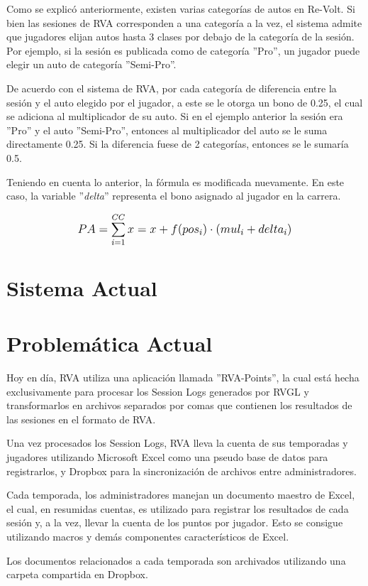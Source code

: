 Como se explicó anteriormente, existen varias categorías de autos en Re-Volt. Si bien las sesiones de RVA corresponden a una categoría a la vez, el sistema admite que jugadores elijan autos hasta 3 clases por debajo de la categoría de la sesión. Por ejemplo, si la sesión es publicada como de categoría ''Pro'', un jugador puede elegir un auto de categoría ''Semi-Pro''.

De acuerdo con el sistema de RVA, por cada categoría de diferencia entre la sesión y el auto elegido por el jugador, a este se le otorga un bono de 0.25, el cual se adiciona al multiplicador de su auto. Si en el ejemplo anterior la sesión era ''Pro'' y el auto ''Semi-Pro'', entonces al multiplicador del auto se le suma directamente 0.25. Si la diferencia fuese de 2 categorías, entonces se le sumaría 0.5.

Teniendo en cuenta lo anterior, la fórmula es modificada nuevamente. En este caso, la variable ''\textit{delta}'' representa el bono asignado al jugador en la carrera.

\[
\mathlarger{{PA} = \sum_{i=1}^{CC}x=x+f(pos_i) \cdot \left(mul_i + delta_i\right)}
\]

\section{Sistema Actual}

\section{Problemática Actual}
Hoy en día,  RVA utiliza una aplicación llamada ''RVA-Points'', la cual está hecha exclusivamente para procesar los Session Logs generados por RVGL y transformarlos en archivos separados por comas que contienen los resultados de las sesiones en el formato de RVA.

Una vez procesados los Session Logs, RVA lleva la cuenta de sus temporadas y jugadores utilizando Microsoft Excel como una pseudo base de datos para registrarlos, y Dropbox para la sincronización de archivos entre administradores.

Cada temporada, los administradores manejan un documento maestro de Excel, el cual, en resumidas cuentas, es utilizado para registrar los resultados de cada sesión y, a la vez, llevar la cuenta de los puntos por jugador. Esto se consigue utilizando macros y demás componentes característicos de Excel.

Los documentos relacionados a cada temporada son archivados utilizando una carpeta compartida en Dropbox.

